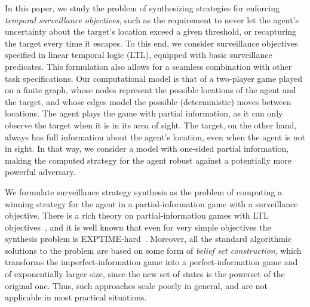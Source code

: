 In this paper, we study the problem of synthesizing strategies for enforcing \emph{temporal surveillance objectives}, such as the requirement to never let the agent's uncertainty about the target's location exceed a given threshold, or recapturing the target every time it escapes. To this end, we consider surveillance objectives specified in linear temporal logic (LTL), equipped with basic surveillance predicates. This formulation also allows for a seamless combination with other task specifications. Our computational model is that of a two-player game played on a finite graph, whose nodes represent the possible locations of the agent and the target, and whose edges model the possible (deterministic) moves between locations. The agent plays the game with partial information, as it can only observe the target when  it is in its area of sight. The target, on the other hand, always has full information about the agent's location, even when the agent is not in sight. In that way, we consider a model with one-sided partial information, making the computed strategy for the agent robust against a potentially more powerful adversary. 

We formulate surveillance strategy synthesis as the problem of computing a winning strategy for the agent in a partial-information game with a surveillance objective. There is a rich theory on partial-information games with LTL objectives~\cite{DoyenR11,Chatterjee2013}, and it is well known that even for very simple objectives the synthesis problem is EXPTIME-hard~\cite{Reif84,BerwangerD08}. Moreover, all the standard algorithmic solutions to the problem are based on some form of \emph{belief set construction}, which transforms the imperfect-information game into a perfect-information game and of exponentially larger size, since the new set of states is the powerset of the original one. Thus, such approaches scale poorly in general, and are not applicable in most practical situations.


